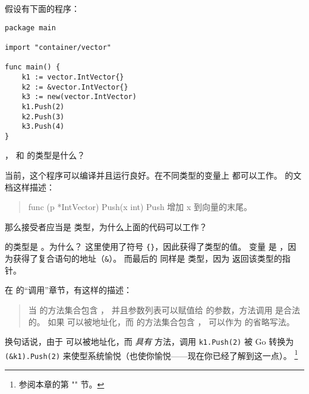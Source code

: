\begin{Exercise}[title={方法调用},difficulty=8]
\label{ex:methodcalls}
\Question \label{ex:methodcalls q1} 假设有下面的程序：
\begin{lstlisting}
package main

import "container/vector"

func main() {
	k1 := vector.IntVector{}
	k2 := &vector.IntVector{}
	k3 := new(vector.IntVector)
	k1.Push(2)
	k2.Push(3)
	k3.Push(4)
}
\end{lstlisting}
， 和  的类型是什么？

\Question 当前，这个程序可以编译并且运行良好。在不同类型的变量上 
都可以工作。 的文档这样描述：
\begin{quote}
func (p *IntVector) Push(x int)
Push 增加 x 到向量的末尾。
\end{quote}
那么接受者应当是  类型，为什么上面的代码可以工作？

\end{Exercise}

\begin{Answer}
\Question {} 的类型是 。为什么？
这里使用了符号 \verb|{}|，因此获得了类型的值。
变量  是 ，因为获得了复合语句的地址（\verb|&|）。
而最后的  同样是  类型，因为 
返回该类型的指针。

\Question 在 \cite{go_spec} 的“调用”章节，有这样的描述：
\begin{quote}
当  的方法集合包含 ，
并且参数列表可以赋值给  的参数，方法调用  是合法的。
如果  可以被地址化，而  的方法集合包含 ，
 可以作为  的省略写法。
\end{quote}
换句话说，由于  可以被地址化，而 
\emph{具有}  方法，调用 \lstinline{k1.Push(2)} 被 Go 转换为 
\lstinline{(&k1).Push(2)} 来使型系统愉悦（也使你愉悦——现在你已经了解到这一点）。
\footnote{参阅本章的第 "" 节。}

\end{Answer}
